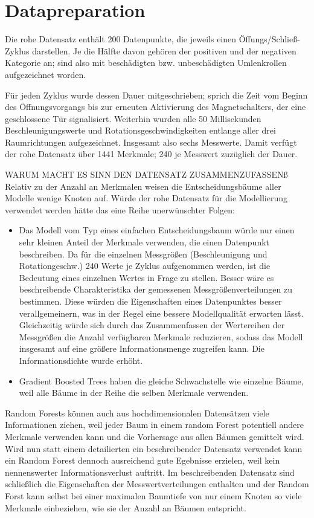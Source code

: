 \chapter{Datapreparation}
\label{ch:datapreparation}

Die rohe Datensatz enthält 200 Datenpunkte, die jeweils einen Öffungs/Schließ-Zyklus darstellen. Je die Hälfte davon gehören der positiven und der negativen Kategorie an; sind also mit beschädigten bzw. unbeschädigten Umlenkrollen aufgezeichnet worden.

Für jeden Zyklus wurde dessen Dauer mitgeschrieben; sprich die Zeit vom Beginn des Öffnungsvorgangs bis zur erneuten Aktivierung des Magnetschalters, der eine geschlossene Tür signalisiert. 
Weiterhin wurden alle 50 Millisekunden Beschleunigungswerte und Rotationsgeschwindigkeiten entlange aller drei Raumrichtungen aufgezeichnet. Insgesamt also sechs Messwerte.
Damit verfügt der rohe Datensatz über 1441 Merkmale; 240 je Messwert zuzüglich der Dauer.

WARUM MACHT ES SINN DEN DATENSATZ ZUSAMMENZUFASSENß
Relativ zu der Anzahl an Merkmalen weisen die Entscheidungsbäume aller Modelle wenige Knoten auf. Würde der rohe Datensatz für die Modellierung verwendet werden hätte das eine Reihe unerwünschter Folgen:
\begin{itemize}
    \item Das Modell vom Typ eines einfachen Entscheidungsbaum würde nur einen sehr kleinen Anteil der Merkmale verwenden, die einen Datenpunkt beschreiben. Da für die einzelnen Messgrößen (Beschleunigung und Rotationgeschw.) 240 Werte je Zyklus aufgenommen werden, ist die Bedeutung eines einzelnen Wertes in Frage zu stellen. Besser wäre es beschreibende Charakteristika der gemessenen Messgrößenverteilungen zu bestimmen. Diese würden die Eigenschaften eines Datenpunktes besser verallgemeinern, was in der Regel eine bessere Modellqualität erwarten lässt. Gleichzeitig würde sich durch das Zusammenfassen der Wertereihen der Messgrößen die Anzahl verfügbaren Merkmale reduzieren, sodass das Modell insgesamt auf eine größere Informationsmenge zugreifen kann. Die Informationsdichte wurde erhöht.
    \item Gradient Boosted Trees haben die gleiche Schwachstelle wie einzelne Bäume, weil alle Bäume in der Reihe die selben Merkmale verwenden. 
\end{itemize}

Random Forests können auch aus hochdimensionalen Datensätzen viele Informationen ziehen, weil jeder Baum in einem random Forest potentiell andere Merkmale verwenden kann und die Vorhersage aus allen Bäumen gemittelt wird. Wird nun statt einem detailierten ein beschreibender Datensatz verwendet kann ein Random Forest dennoch ausreichend gute Egebnisse erzielen, weil kein nennenswerter Informationsverlust auftritt. Im beschreibenden Datensatz sind schließlich die Eigenschaften der Messwertverteilungen enthalten und der Random Forst kann selbst bei einer maximalen Baumtiefe von nur einem Knoten so viele Merkmale einbeziehen, wie sie der Anzahl an Bäumen entspricht. 


